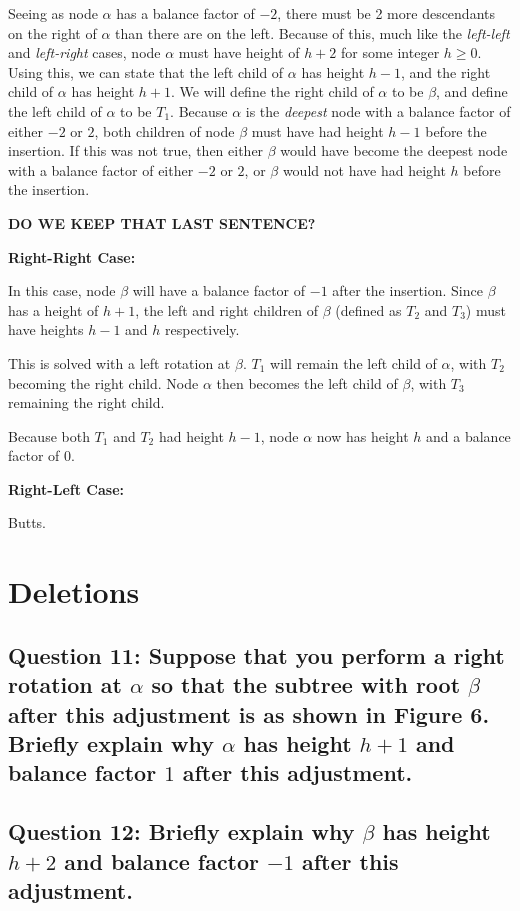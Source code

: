 \documentclass[a4paper, 12pt, titlepage]{article}
\begin{document}
Seeing as node $\alpha$ has a balance factor of $-2$,
there must be 2 more descendants on the right of $\alpha$ than there are on the left.
Because of this,
much like the \textit{left-left} and \textit{left-right} cases,
node $\alpha$ must have height of $h+2$ for some integer $h\geq{}0$.
Using this,
we can state that the left child of $\alpha$ has height $h-1$,
and the right child of $\alpha$ has height $h+1$.
We will define the right child of $\alpha$ to be $\beta$,
and define the left child of $\alpha$ to be $T_1$.
Because $\alpha$ is the \textit{deepest} node with a balance factor of either $-2$ or $2$,
both children of node $\beta$ must have had height $h-1$ before the insertion.
If this was not true,
then either $\beta$ would have become the deepest node with a balance factor of either $-2$ or $2$,
or $\beta$ would not have had height $h$ before the insertion.

\textbf{DO WE KEEP THAT LAST SENTENCE?}

\noindent
\textbf{Right-Right Case:}

In this case,
node $\beta$ will have a balance factor of $-1$ after the insertion.
Since $\beta$ has a height of $h+1$,
the left and right children of $\beta$
(defined as $T_2$ and $T_3$)
must have heights $h-1$ and $h$ respectively.

This is solved with a left rotation at $\beta$.
$T_1$ will remain the left child of $\alpha$,
with $T_2$ becoming the right child.
Node $\alpha$ then becomes the left child of $\beta$,
with $T_3$ remaining the right child.

Because both $T_1$ and $T_2$ had height $h-1$,
node $\alpha$ now has height $h$ and a balance factor of $0$.


\noindent
\textbf{Right-Left Case:}

Butts.

\section*{Deletions}

\subsection*{Question 11: Suppose that you perform a right rotation at $\alpha$ so that the subtree with root $\beta$ after this adjustment is as shown in Figure 6. Briefly explain why $\alpha$ has height $h+1$ and balance factor $1$ after this adjustment.} 

\subsection*{Question 12: Briefly explain why $\beta$ has height $h+2$ and balance factor $-1$ after this adjustment.} 
\end{document}

